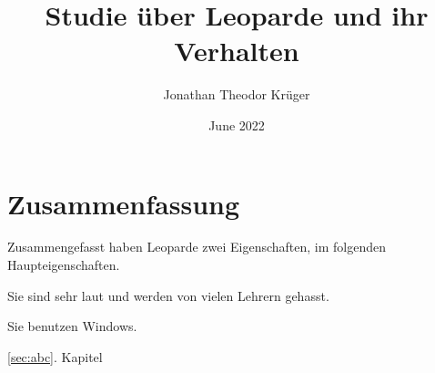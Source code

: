 \documentclass{article}
\title{Studie über Leoparde und ihr Verhalten}
\author{Jonathan Theodor Kr\"uger }
\date{June 2022}
\begin{document}
\maketitle
\tableofcontents{}
\section{Zusammenfassung}
Zusammengefasst haben Leoparde zwei Eigenschaften, im folgenden Haupteigenschaften.
\begin{list}
\item[ Sie sind sehr laut und werden von vielen Lehrern gehasst.]
\label{sec:abc}
\item[\par Sie benutzen Windows.]
\end{list}

\ref{sec:abc}. Kapitel
\end{document}
